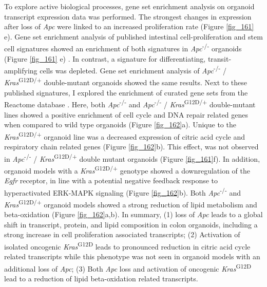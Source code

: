 \begin{flushleft}
To explore active biological processes, gene set enrichment analysis on organoid transcript expression data was performed. The strongest changes in expression after loss of \textit{Apc} were linked to an increased proliferation rate (Figure \ref{fig_161} e). Gene set enrichment analysis of published intestinal cell-proliferation and stem cell signatures showed an enrichment of both signatures in \textit{Apc}\textsuperscript{-/-}  organoids (Figure \ref{fig_161} e) \parencite{merlos-suarezIntestinalStemCell2011}. In contrast, a signature for differentiating, transit-amplifying cells was depleted. Gene set enrichment analysis of \textit{Apc}\textsuperscript{-/-} / \textit{Kras}\textsuperscript{G12D/+} double-mutant organoids showed the same results. Next to these published signatures, I explored the enrichment of curated gene sets from the Reactome database \parencite{grissReactomeGSAEfficientMultiOmics2020}. Here, both \textit{Apc}\textsuperscript{-/-}  and \textit{Apc}\textsuperscript{-/-} / \textit{Kras}\textsuperscript{G12D/+} double-mutant lines showed a positive enrichment of cell cycle and DNA repair related genes when compared to wild type organoids (Figure \ref{fig_162}a). Unique to the \textit{Kras}\textsuperscript{G12D/+} organoid line was a decreased expression of citric acid cycle and respiratory chain related genes (Figure \ref{fig_162}b). This effect, was not observed in \textit{Apc}\textsuperscript{-/-} / \textit{Kras}\textsuperscript{G12D/+} double mutant organoids (Figure \ref{fig_161}f). In addition, organoid models with a \textit{Kras}\textsuperscript{G12D/+} genotype showed a downregulation of the \textit{Egfr} receptor, in line with a potential negative feedback response to hyperactivated ERK-MAPK signaling (Figure \ref{fig_162}b). Both \textit{Apc}\textsuperscript{-/-}  and \textit{Kras}\textsuperscript{G12D/+} organoid models showed a strong reduction of lipid metabolism and beta-oxidation (Figure \ref{fig_162}a,b). In summary, (1) loss of \textit{Apc} leads to a global shift in transcript, protein, and lipid composition in colon organoids, including a strong increase in cell proliferation associated transcripts; (2) Activation of isolated oncogenic \textit{Kras}\textsuperscript{G12D} leads to pronounced reduction in citric acid cycle related transcripts while this phenotype was not seen in organoid models with an additional loss of \textit{Apc}; (3) Both \textit{Apc} loss and activation of oncogenic \textit{Kras}\textsuperscript{G12D} lead to a reduction of lipid beta-oxidation related transcripts.


\end{flushleft}
